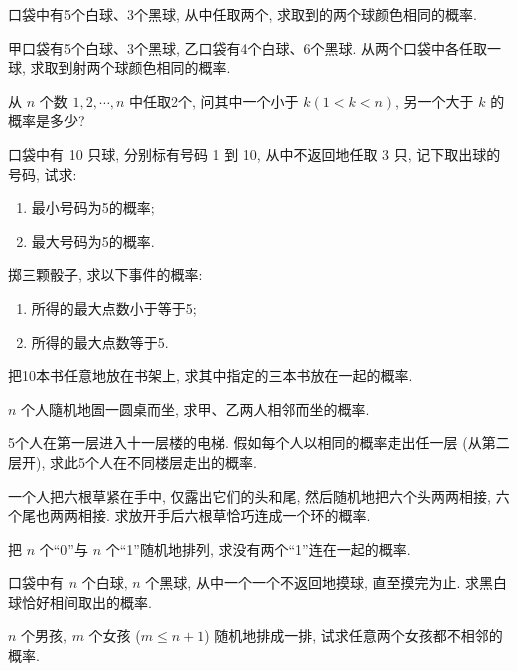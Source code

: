 \begin{xiti}
  \item 口袋中有5个白球、3个黑球,
  从中任取两个,
  求取到的两个球颜色相同的概率.

  \item 甲口袋有5个白球、3个黑球,
  乙口袋有4个白球、6个黑球.
  从两个口袋中各任取一球,
  求取到射两个球颜色相同的概率.

  \item 从 $n$ 个数 $1, 2, \cdots, n$ 中任取2个,
  问其中一个小于 $k (1 < k < n)$,
  另一个大于 $k$ 的概率是多少?

  \item 口袋中有 10 只球,
  分别标有号码 1 到 10,
  从中不返回地任取 3 只,
  记下取出球的号码,
  试求:
  \begin{enumerate}
    \item 最小号码为5的概率;
    \item 最大号码为5的概率.
  \end{enumerate}

  \item 掷三颗骰子,
  求以下事件的概率:
  \begin{enumerate}
    \item 所得的最大点数小于等于5;
    \item 所得的最大点数等于5.
  \end{enumerate}

  \item 把10本书任意地放在书架上,
  求其中指定的三本书放在一起的概率.

  \item $n$ 个人隨机地圄一圆桌而坐,
  求甲、乙两人相邻而坐的概率.

  \item 5个人在第一层进入十一层楼的电梯.
  假如每个人以相同的概率走出任一层 (从第二层开),
  求此5个人在不同楼层走出的概率.

  \item 一个人把六根草紧在手中,
  仅露出它们的头和尾,
  然后随机地把六个头两两相接,
  六个尾也两两相接.
  求放开手后六根草恰巧连成一个环的概率.

  \item 把 $n$ 个“0”与 $n$ 个“1”随机地排列,
  求没有两个“1”连在一起的概率.

  \item 口袋中有 $n$ 个白球,
  $n$ 个黑球,
  从中一个一个不返回地摸球,
  直至摸完为止.
  求黑白球恰好相间取出的概率.

  \item $n$ 个男孩,
  $m$ 个女孩 ($m \le n + 1$) 随机地排成一排,
  试求任意两个女孩都不相邻的概率.


\end{xiti}
